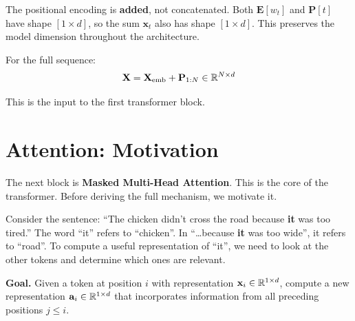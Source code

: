 \documentclass[main.tex]{subfiles}
\begin{document}
\begin{remark}
The positional encoding is \textbf{added}, not concatenated. Both $\mathbf{E}[w_t]$ and $\mathbf{P}[t]$ have shape $[1 \times d]$, so the sum $\mathbf{x}_t$ also has shape $[1 \times d]$. This preserves the model dimension throughout the architecture.
\end{remark}

For the full sequence:
$$\mathbf{X} = \mathbf{X}_{\text{emb}} + \mathbf{P}_{1:N} \in \mathbb{R}^{N \times d}$$

This is the input to the first transformer block.

\begin{center}
\end{center}

\needspace{0.33\textheight}
\section{Attention: Motivation}

The next block is \textbf{Masked Multi-Head Attention}. This is the core of the transformer. Before deriving the full mechanism, we motivate it.

Consider the sentence: ``The chicken didn't cross the road because \textbf{it} was too tired.'' The word ``it'' refers to ``chicken''. In ``\ldots because \textbf{it} was too wide'', it refers to ``road''. To compute a useful representation of ``it'', we need to look at the other tokens and determine which ones are relevant.

\textbf{Goal.} Given a token at position $i$ with representation $\mathbf{x}_i \in \mathbb{R}^{1 \times d}$, compute a new representation $\mathbf{a}_i \in \mathbb{R}^{1 \times d}$ that incorporates information from all preceding positions $j \leq i$.
\end{document}
